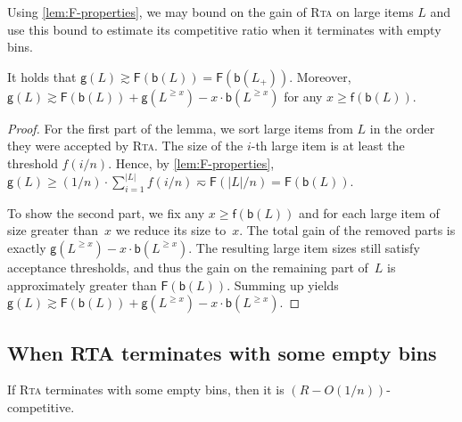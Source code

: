 \documentclass[a4paper,USenglish,cleveref]{lipics-v2019}
\newcommand{\LG}{\ensuremath{L}\xspace}
\newcommand{\LT}{\ensuremath{L_+}\xspace}
\newcommand{\f}{\textsf{f}}
\newcommand{\fintegral}{\textsf{F}}
\newcommand{\B}{\textsf{b}}
\newcommand{\gain}{\textsf{g}}
\newcommand{\ALG}{\textsc{Rta}\xspace}
\begin{document}
Using \cref{lem:F-properties}, we may bound on the gain of \ALG on large items $L$
and use this bound to estimate its competitive ratio when it terminates with empty bins.

\begin{lemma}
\label{lem:large-gain}
It holds that $\gain(\LG) \gtrsim \fintegral(\B(\LG)) = \fintegral(\B(\LT))$. Moreover, $\gain(\LG)
\gtrsim \fintegral(\B(\LG)) + \gain(\LG^{\geq x}) - x \cdot \B(\LG^{\geq x})$
for any $x \geq \f(\B(\LG))$.
\end{lemma}

\begin{proof}
For the first part of the lemma, we sort large
items from $L$ in the order they were accepted by \ALG. The size of the $i$-th
large item is at least the threshold $f(i/n)$. Hence, by
\cref{lem:F-properties}, $\gain(L) \geq (1/n) \cdot \sum_{i=1}^{|L|} f(i/n)
\eqsim \fintegral(|L|/n) = \fintegral(\B(\LG))$.

To show the second part, we fix any $x \geq \f(\B(\LG))$ and for each large item
of size greater than~$x$ we reduce its size to~$x$. The total gain of the
removed parts is exactly $\gain(\LG^{\geq x}) - x \cdot \B(\LG^{\geq x})$. The
resulting large item sizes still satisfy acceptance thresholds, and thus the
gain on the remaining part of~$\LG$ is approximately greater than
$\fintegral(\B(\LG))$. Summing up yields $\gain(\LG) \gtrsim
\fintegral(\B(\LG)) + \gain(\LG^{\geq x}) - x \cdot \B(\LG^{\geq x})$.
\end{proof}



\subsection{When RTA terminates with some empty bins}

\begin{lemma}
\label{lem:empty}
If \ALG terminates with some empty bins, then it is $(R - O(1/n))$-competitive. 
\end{lemma}
\end{document}
